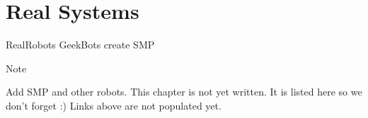 \hypertarget{Chap:RealSys}{%
\section{Real Systems}\label{Chap:RealSys}}

RealRobots GeekBots create SMP

Note

Add SMP and other robots. This chapter is not yet written. It is listed
here so we don't forget :) Links above are not populated yet.
